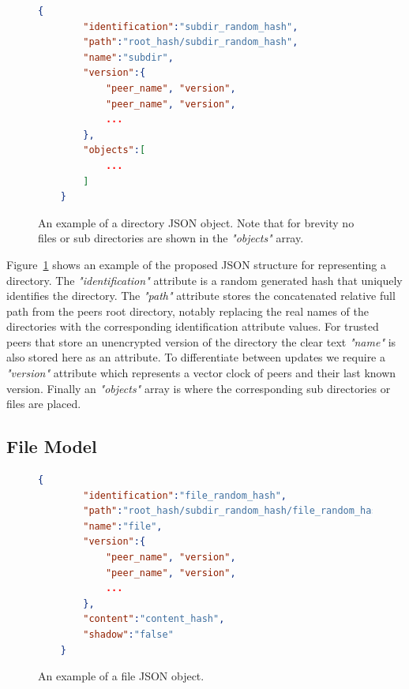 \begin{figure}[htp]
    \begin{lstlisting}[language=json,firstnumber=0]
    {
        "identification":"subdir_random_hash",
        "path":"root_hash/subdir_random_hash",
        "name":"subdir",
        "version":{
            "peer_name", "version",
            "peer_name", "version",
            ...
        },
        "objects":[
            ...
        ]
    }
    \end{lstlisting}
\caption[Directory JSON Model]{An example of a directory JSON object. Note that for brevity no files or sub directories are shown in the \textit{"objects"} array.}
\label{json:directory_model}
\end{figure}

Figure~\ref{json:directory_model} shows an example of the proposed JSON structure for representing a directory.
The \textit{"identification"} attribute is a random generated hash that uniquely identifies the directory.
The \textit{"path"} attribute stores the concatenated relative full path from the peers root directory, notably replacing the real names of the directories with the corresponding identification attribute values.
For trusted peers that store an unencrypted version of the directory the clear text \textit{"name"} is also stored here as an attribute.
To differentiate between updates we require a \textit{"version"} attribute which represents a vector clock of peers and their last known version.
Finally an \textit{"objects"} array is where the corresponding sub directories or files are placed.

\subsection{File Model}
\label{sec:file_model}

\begin{figure}[htp]
    \begin{lstlisting}[language=json,firstnumber=0]
    {
        "identification":"file_random_hash",
        "path":"root_hash/subdir_random_hash/file_random_hash",
        "name":"file",
        "version":{
            "peer_name", "version",
            "peer_name", "version",
            ...
        },
        "content":"content_hash",
        "shadow":"false"
    }
    \end{lstlisting}
\caption[File JSON Model]{An example of a file JSON object.}
\label{json:file_model}
\end{figure}

